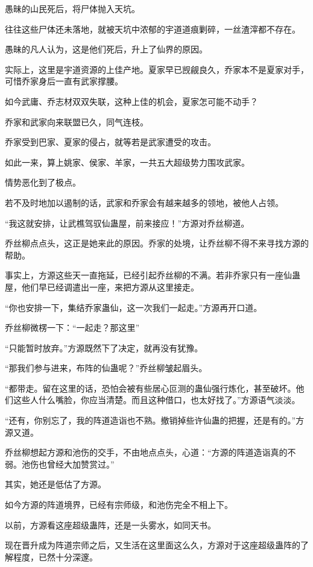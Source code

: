 \begin{this_body}
愚昧的山民死后，将尸体抛入天坑。

往往这些尸体还未落地，就被天坑中浓郁的宇道道痕剿碎，一丝渣滓都不存在。

愚昧的凡人认为，这是他们死后，升上了仙界的原因。

实际上，这里是宇道资源的上佳产地。夏家早已觊觎良久，乔家本不是夏家对手，可惜乔家身后一直有武家撑腰。

如今武庸、乔志材双双失联，这种上佳的机会，夏家怎可能不动手？

乔家和武家向来联盟已久，同气连枝。

乔家受到巴家、夏家的侵占，就等若是武家遭受的攻击。

如此一来，算上姚家、侯家、羊家，一共五大超级势力围攻武家。

情势恶化到了极点。

若不及时地加以遏制的话，武家和乔家会有越来越多的领地，被他人占领。

“我这就安排，让武樵驾驭仙蛊屋，前来接应！”方源对乔丝柳道。

乔丝柳点点头，这正是她来此的原因。乔家的处境，让乔丝柳不得不来寻找方源的帮助。

事实上，方源这些天一直拖延，已经引起乔丝柳的不满。若非乔家只有一座仙蛊屋，他们早已经调遣出一座，来把方源从这里接走。

“你也安排一下，集结乔家蛊仙，这一次我们一起走。”方源再开口道。

乔丝柳微楞一下：“一起走？那这里”

“只能暂时放弃。”方源既然下了决定，就再没有犹豫。

“那我们参与进来，布阵的仙蛊呢？”乔丝柳皱起眉头。

“都带走。留在这里的话，恐怕会被有些居心叵测的蛊仙强行炼化，甚至破坏。他们这些人什么嘴脸，你应当清楚。而且这种借口，也太好找了。”方源语气淡淡。

“还有，你别忘了，我的阵道造诣也不熟。撤销掉些许仙蛊的把握，还是有的。”方源又道。

乔丝柳想起方源和池伤的交手，不由地点点头，心道：“方源的阵道造诣真的不弱。池伤也曾经大加赞赏过。”

其实，她还是低估了方源。

如今方源的阵道境界，已经有宗师级，和池伤完全不相上下。

以前，方源看这座超级蛊阵，还是一头雾水，如同天书。

现在晋升成为阵道宗师之后，又生活在这里面这么久，方源对于这座超级蛊阵的了解程度，已然十分深邃。


\end{this_body}
